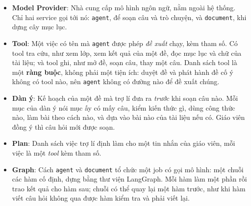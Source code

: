 \begin{itemize}
  \item \textbf{Model Provider}: Nhà cung cấp mô hình ngôn ngữ, nằm ngoài hệ thống. Chỉ hai service
        gọi tới nó: \texttt{agent}, để soạn câu và trò chuyện, và \texttt{document}, khi dựng cây
        mục lục.
  \item \textbf{Tool}: Một việc có tên mà \texttt{agent} được phép \emph{đề xuất} chạy, kèm tham
        số. Có tool tra cứu, như xem lớp, xem kết quả của một đề, đọc mục lục và chữ của tài liệu;
        và tool ghi, như mở đề, soạn câu, thay một câu. Danh sách tool là một \textbf{ràng buộc},
        không phải một tiện ích: duyệt đề và phát hành đề cố ý không có tool nào, nên
        \texttt{agent} không có đường nào để đề xuất chúng.
  \item \textbf{Dàn ý}: Kế hoạch của một đề mà trợ lí đưa ra \emph{trước} khi soạn câu nào. Mỗi mục
        của dàn ý nói mục ấy có mấy câu, kiểm kiến thức gì, dùng công thức nào, làm bài theo cách
        nào, và dựa vào bài nào của tài liệu nếu có. Giáo viên đồng ý thì câu hỏi mới được soạn.
  \item \textbf{Plan}: Danh sách việc trợ lí định làm cho một tin nhắn của giáo viên, mỗi việc là
        một \emph{tool} kèm tham số. 
  \item \textbf{Graph}: Cách \texttt{agent} và \texttt{document} tổ chức một job có gọi mô hình:
        một chuỗi các hàm cố định, dựng bằng thư viện LangGraph. Mỗi hàm làm một phần rồi trao
        kết quả cho hàm sau; chuỗi có thể quay lại một hàm trước, như khi hàm viết câu hỏi không
        qua được hàm kiểm tra và phải viết lại.
\end{itemize}
